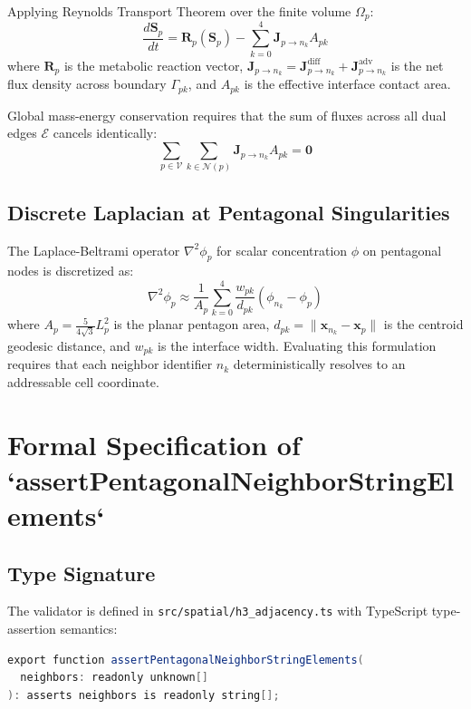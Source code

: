 \documentclass[10pt,journal,compsoc]{IEEEtran}
\begin{document}
Applying Reynolds Transport Theorem over the finite volume $\Omega_p$:
\begin{equation}
\frac{d \mathbf{S}_p}{d t} = \mathbf{R}_p(\mathbf{S}_p) - \sum_{k=0}^{4} \mathbf{J}_{p \to n_k} A_{pk}
\end{equation}
where $\mathbf{R}_p$ is the metabolic reaction vector, $\mathbf{J}_{p \to n_k} = \mathbf{J}_{p \to n_k}^{\text{diff}} + \mathbf{J}_{p \to n_k}^{\text{adv}}$ is the net flux density across boundary $\Gamma_{pk}$, and $A_{pk}$ is the effective interface contact area.

Global mass-energy conservation requires that the sum of fluxes across all dual edges $\mathcal{E}$ cancels identically:
\begin{equation}
\sum_{p \in \mathcal{V}} \sum_{k \in \mathcal{N}(p)} \mathbf{J}_{p \to n_k} A_{pk} = \mathbf{0}
\end{equation}

\subsection{Discrete Laplacian at Pentagonal Singularities}
The Laplace-Beltrami operator $\nabla^2 \phi_p$ for scalar concentration $\phi$ on pentagonal nodes is discretized as:
\begin{equation}
\nabla^2 \phi_p \approx \frac{1}{A_p} \sum_{k=0}^{4} \frac{w_{pk}}{d_{pk}} (\phi_{n_k} - \phi_p)
\end{equation}
where $A_p = \frac{5}{4 \sqrt{3}} L_p^2$ is the planar pentagon area, $d_{pk} = \|\mathbf{x}_{n_k} - \mathbf{x}_p\|$ is the centroid geodesic distance, and $w_{pk}$ is the interface width. Evaluating this formulation requires that each neighbor identifier $n_k$ deterministically resolves to an addressable cell coordinate.

\section{Formal Specification of `assertPentagonalNeighborStringElements`}

\subsection{Type Signature}
The validator is defined in \texttt{src/spatial/h3\_adjacency.ts} with TypeScript type-assertion semantics:
\begin{lstlisting}[language=Java]
export function assertPentagonalNeighborStringElements(
  neighbors: readonly unknown[]
): asserts neighbors is readonly string[];
\end{lstlisting}
\end{document}

